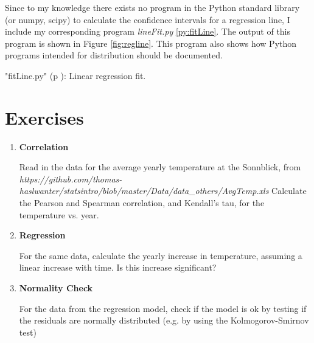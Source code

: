Since to my knowledge there exists no program in the Python standard library (or numpy, scipy) to calculate the confidence intervals for a regression line, I include my corresponding program \emph{lineFit.py} \ref{py:fitLine}. The output of this program is shown in Figure \ref{fig:regline}. This program also shows how Python programs intended for distribution should be documented.

\PyImg "fitLine.py" (p \pageref{py:fitLine}): Linear regression fit.

\section{Exercises}

\begin{enumerate}
  \item \textbf{Correlation}

    Read in the data for the average yearly temperature at the Sonnblick, from     \emph{https://github.com/thomas-haslwanter/statsintro/blob/master/Data/data\_others/AvgTemp.xls}
    Calculate the Pearson and Spearman correlation, and Kendall's tau, for the temperature vs. year.

  \item \textbf{Regression}

    For the same data, calculate the yearly increase in temperature, assuming a linear increase with time.
    Is this increase significant?

  \item \textbf{Normality Check}

    For the data from the regression model, check if the model is ok by testing if the residuals are normally distributed (e.g. by using the Kolmogorov-Smirnov test)

\end{enumerate}


